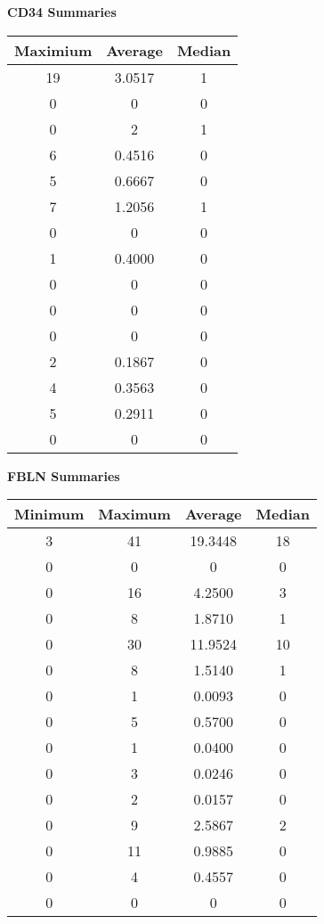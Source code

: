 \documentclass{article}
\begin{document}
\vspace{25pt}

\textbf{\large{CD34 Summaries}}

\vspace{5pt}

\begin{tabular}{|c|c|c|}
\hline
Maximium & Average & Median \\
\hline
19 & 3.0517 & 1 \\
\hline
0 & 0 & 0 \\
\hline
0 & 2 & 1 \\
\hline
6 & 0.4516 & 0 \\
\hline
5 & 0.6667 & 0 \\
\hline
7 & 1.2056 & 1 \\
\hline
0 & 0 & 0 \\
\hline
1 & 0.4000 & 0 \\
\hline
0 & 0 & 0 \\
\hline
0 & 0 & 0 \\
\hline
0 & 0 & 0 \\
\hline
2 & 0.1867 & 0 \\
\hline
4 & 0.3563 & 0 \\
\hline
5 & 0.2911 & 0 \\
\hline
0 & 0 & 0 \\
\hline
\end{tabular}

\vspace{25pt}

\textbf{\large{FBLN Summaries}}

\vspace{5pt}

\begin{tabular}{|c|c|c|c|}
\hline
Minimum & Maximum & Average & Median \\
\hline
3 & 41 & 19.3448 & 18 \\
\hline
0 & 0 & 0 & 0 \\
\hline
0 & 16 & 4.2500 & 3 \\
\hline
0 & 8 & 1.8710 & 1 \\
\hline
0 & 30 & 11.9524 & 10 \\
\hline
0 & 8 & 1.5140 & 1 \\
\hline
0 & 1 & 0.0093 & 0 \\
\hline
0 & 5 & 0.5700 & 0 \\
\hline
0 & 1 & 0.0400 & 0 \\
\hline
0 & 3 & 0.0246 & 0 \\
\hline
0 & 2 & 0.0157 & 0 \\
\hline
0 & 9 & 2.5867 & 2 \\
\hline
0 & 11 & 0.9885 & 0 \\
\hline
0 & 4 & 0.4557 & 0 \\
\hline
0 & 0 & 0 & 0 \\
\hline
\end{tabular}
\end{document}
